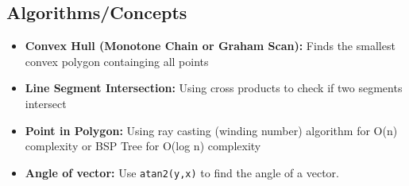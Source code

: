 \subsection{Algorithms/Concepts}

\begin{itemize}
    \item \textbf{Convex Hull (Monotone Chain or Graham Scan): }Finds the smallest convex polygon containging all points
    \item \textbf{Line Segment Intersection: }Using cross products to check if two segments intersect
    \item \textbf{Point in Polygon: }Using ray casting (winding number) algorithm for O(n) complexity or BSP Tree for O(log n) complexity
    \item \textbf{Angle of vector: }Use \texttt{atan2(y,x)} to find the angle of a vector.
\end{itemize}